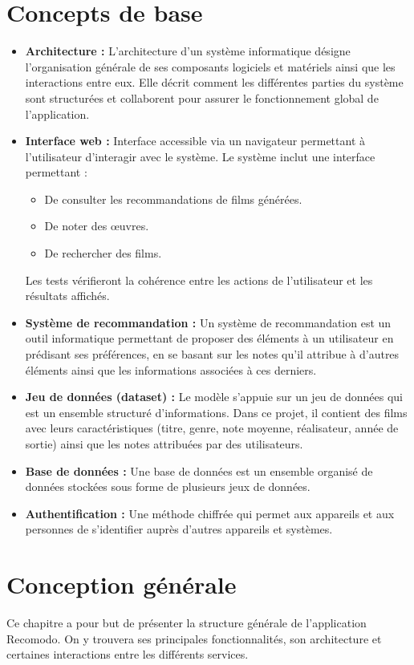 \documentclass[a4paper,12pt]{report}
\begin{document}
\chapter{Concepts de base}
\begin{itemize}
    \item \textbf{Architecture :} L’architecture d’un système informatique désigne l’organisation générale de ses composants logiciels et matériels ainsi que les interactions entre eux. Elle décrit comment les différentes parties du système sont structurées et collaborent pour assurer le fonctionnement global de l’application.
        \item \textbf{Interface web :} Interface accessible via un navigateur permettant à l’utilisateur d’interagir avec le système. Le
système inclut une interface permettant :
\begin{itemize}
    \item De consulter les recommandations de films générées.
    \item De noter des œuvres.
    \item De rechercher des films.
\end{itemize}
Les tests vérifieront la cohérence entre les actions de l’utilisateur et les résultats affichés.
    \item \textbf{Système de recommandation :} Un système de recommandation est un outil informatique permettant de proposer des éléments à un utilisateur en prédisant ses préférences, en se basant sur les notes qu’il attribue à d’autres éléments ainsi que les informations associées à ces derniers.

    \item \textbf{Jeu de données (dataset) :}
Le modèle s’appuie sur un jeu de données qui est un ensemble structuré d’informations. Dans
ce projet, il contient des films avec leurs caractéristiques (titre, genre, note moyenne, réalisateur,
année de sortie) ainsi que les notes attribuées par des utilisateurs.

\item \textbf{Base de données :} Une base de données est un ensemble organisé de données stockées sous forme de plusieurs jeux de données.
    \item \textbf{Authentification :} Une méthode chiffrée qui permet aux appareils et aux personnes de s'identifier auprès d'autres appareils et systèmes.

\end{itemize}

\chapter{Conception générale}
Ce chapitre a pour but de présenter la structure générale de l'application Recomodo. On y trouvera ses principales fonctionnalités, son architecture et certaines interactions entre les différents services.
\end{document}
